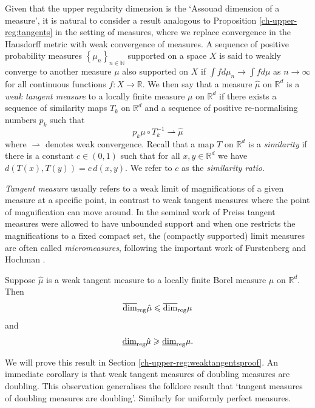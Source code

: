 Given that the upper regularity dimension is the `Assouad dimension of a measure', it is natural to consider a result analogous to Proposition \ref{ch-upper-reg:tangents} in the setting of measures, where we replace convergence in the Hausdorff metric with weak convergence of measures. A sequence of positive probability measures $\left\{\mu_n\right\}_{n\in \mathbb{N}}$ supported on a space $X$ is said to weakly converge to another measure $\mu$ also supported on $X$ if $\int fd \mu_n \rightarrow \int fd \mu$ as $n\rightarrow \infty$ for all continuous functions $f\colon X \rightarrow \mathbb{R}$. We then say that a measure  $\hat{\mu}$ on $ \mathbb{R}^d$ is a \emph{weak tangent measure} to a locally finite measure $\mu$ on $\mathbb{R}^d$ if there exists a sequence of similarity maps $T_k$ on  $\mathbb{R}^d$ and a sequence of positive re-normalising numbers $p_k$ such that
\[
p_k \mu \circ T^{-1}_k  \rightharpoonup \hat{\mu}
\]
where $\rightharpoonup$ denotes weak convergence. Recall that a map $T$ on $\mathbb{R}^d$ is a \emph{similarity} if there is a constant $c  \in \left(0,1 \right)$ such that  for all $x,y \in \mathbb{R}^d$ we have $d(T(x) , T(y) ) = c \, d(x, y )$.  We refer to $c$ as the \emph{similarity ratio}. 

\emph{Tangent measure} usually refers to a weak limit of magnifications of a given measure at a specific point, in contrast to weak tangent measures where the point of magnification can move around. In the seminal work of Preiss \cite{preiss} tangent measures were allowed to have unbounded support and when one restricts the magnifications to a fixed compact set, the (compactly supported) limit measures are often called \emph{micromeasures}, following the important work of Furstenberg \cite{furstenberg} and Hochman \cite{hochman}.  

\begin{theorem}\label{ch-upper-reg:weaktangents}
	Suppose $\hat{\mu}$ is a weak tangent measure to a locally finite Borel measure  $\mu$ on $\mathbb{R}^d$.  Then 
	\[\overline{\dim}_{\textup{reg}} \hat{\mu} \leqslant \overline{\dim}_{\textup{reg}} \mu \]
	and
	\[\underline{\dim}_{\textup{reg}} \hat{\mu} \geqslant \underline{\dim}_{\textup{reg}} \mu.	\]
\end{theorem}

We will prove this result in Section \ref{ch-upper-reg:weaktangentsproof}.  An immediate corollary  is that weak tangent measures of doubling measures are doubling.  This observation generalises the folklore result that `tangent measures of doubling measures are doubling'. Similarly for uniformly perfect measures. 

